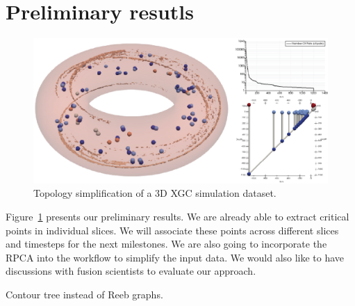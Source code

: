 \section{Preliminary resutls}

\begin{figure}[!h]
  \centering
  \includegraphics[width=\linewidth]{Figs/simplification3D}
  \caption{Topology simplification of a 3D XGC simulation dataset.}
  \label{fig:results}
\end{figure}



Figure~\ref{fig:results} presents our preliminary results.  We are already able to extract critical points in individual slices.  We will associate these points across different slices and timesteps for the next milestones.  We are also going to incorporate the RPCA into the workflow to simplify the input data.  We would also like to have discussions with fusion scientists to evaluate our approach.  


Contour tree instead of Reeb graphs.  